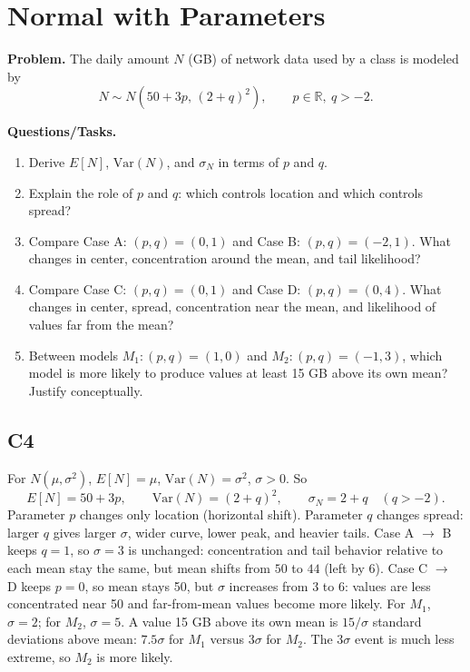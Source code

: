 \section{Normal with Parameters}

\textbf{Problem.}
The daily amount \(N\) (GB) of network data used by a class is modeled by
\[
N\sim N\!\left(50+3p,\,(2+q)^2\right),\qquad p\in\mathbb{R},\ q>-2.
\]

\textbf{Questions/Tasks.}
\begin{enumerate}[label=\textbf{\alph*)}]
  \item Derive \(E[N]\), \(\mathrm{Var}(N)\), and \(\sigma_N\) in terms of \(p\) and \(q\).
  \item Explain the role of \(p\) and \(q\): which controls location and which controls spread?
  \item Compare Case A: \((p,q)=(0,1)\) and Case B: \((p,q)=(-2,1)\). What changes in center, concentration around the mean, and tail likelihood?
  \item Compare Case C: \((p,q)=(0,1)\) and Case D: \((p,q)=(0,4)\). What changes in center, spread, concentration near the mean, and likelihood of values far from the mean?
  \item Between models \(M_1:(p,q)=(1,0)\) and \(M_2:(p,q)=(-1,3)\), which model is more likely to produce values at least 15 GB above its own mean? Justify conceptually.
\end{enumerate}

\subsection*{C4}
For \(N(\mu,\sigma^2)\), \(E[N]=\mu\), \(\mathrm{Var}(N)=\sigma^2\), \(\sigma>0\).
So
\[
E[N]=50+3p,\qquad
\mathrm{Var}(N)=(2+q)^2,\qquad
\sigma_N=2+q \quad (q>-2).
\]
Parameter \(p\) changes only location (horizontal shift). Parameter \(q\) changes spread: larger \(q\) gives larger \(\sigma\), wider curve, lower peak, and heavier tails.
Case A \(\to\) B keeps \(q=1\), so \(\sigma=3\) is unchanged: concentration and tail behavior relative to each mean stay the same, but mean shifts from \(50\) to \(44\) (left by 6).
Case C \(\to\) D keeps \(p=0\), so mean stays 50, but \(\sigma\) increases from \(3\) to \(6\): values are less concentrated near 50 and far-from-mean values become more likely.
For \(M_1\), \(\sigma=2\); for \(M_2\), \(\sigma=5\). A value 15 GB above its own mean is \(15/\sigma\) standard deviations above mean: \(7.5\sigma\) for \(M_1\) versus \(3\sigma\) for \(M_2\). The \(3\sigma\) event is much less extreme, so \(M_2\) is more likely.
\begin{center}
\end{center}


